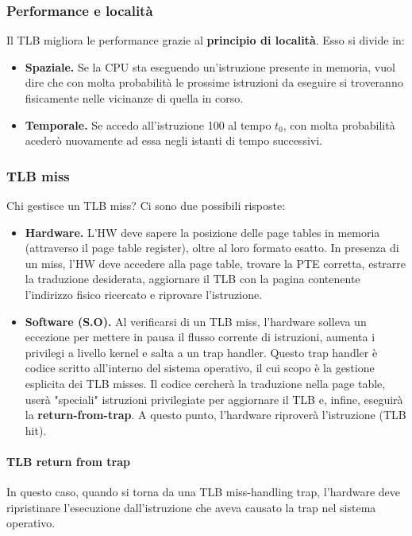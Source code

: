 \documentclass[12pt, twoside, letterpaper]{article}
\begin{document}
			\subsubsection{Performance  e località}
				Il TLB migliora le performance grazie al \textbf{principio di località}. Esso si divide in:
				\begin{itemize}
					\item \textbf{Spaziale.} Se la CPU sta eseguendo un'istruzione presente in memoria, vuol dire che con molta probabilità le prossime istruzioni da eseguire si troveranno fisicamente nelle vicinanze di quella in corso.
					\item \textbf{Temporale.} Se accedo all'istruzione 100 al tempo $t_0$, con molta probabilità acederò nuovamente ad essa negli istanti di tempo successivi. 
				\end{itemize}
			
			\subsubsection{TLB miss}
				Chi gestisce un TLB miss? Ci sono due possibili risposte:
				\begin{itemize}
					\item \textbf{Hardware.} L'HW deve sapere la posizione delle page tables in memoria (attraverso il page table register), oltre al loro formato esatto. In presenza di un miss, l'HW deve accedere alla page table, trovare la PTE corretta, estrarre la traduzione desiderata, aggiornare il TLB con la pagina contenente l'indirizzo fisico ricercato e riprovare l'istruzione.
					\item\textbf{Software (S.O).} Al verificarsi di un TLB miss, l'hardware solleva un eccezione per mettere in pausa il flusso corrente di istruzioni, aumenta i privilegi a livello kernel e salta a un trap handler. Questo trap handler è codice scritto all'interno del sistema operativo, il cui scopo è la gestione esplicita dei TLB misses. Il codice cercherà la traduzione nella page table, userà "speciali" istruzioni privilegiate per aggiornare il TLB e, infine, eseguirà la \textbf{return-from-trap}. A questo punto, l'hardware riproverà l'istruzione (TLB hit).
				\end{itemize}
				\paragraph{TLB return from trap} In questo caso, quando si torna da una TLB miss-handling trap, l'hardware deve ripristinare l'esecuzione dall'istruzione che aveva causato la trap nel sistema operativo.
				
\end{document}
